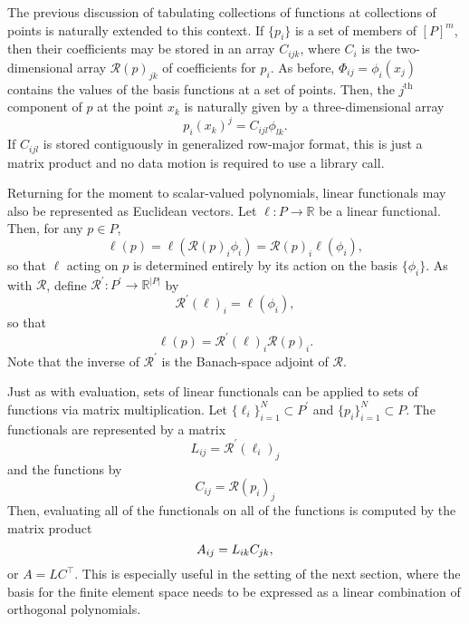 The previous discussion of tabulating collections of functions at
collections of points is naturally extended to this context.  If \( \{ p_i
\} \) is a set of members of \( [P]^m \), then their coefficients may be
stored in an array \( C_{ijk} \), where \( C_i \) is the two-dimensional
array \( \mathcal{R}(p)_{jk} \) of coefficients for \( p_i \).  As before,
\( \Phi_{ij} = \phi_i(x_j) \) contains the values of the basis functions at a set
of points.  Then, the \( j^\mathrm{th} \) component of \( p \) at the
point \( x_k \) is naturally given by a three-dimensional array
\[
p_i(x_k)^j = C_{ijl} \phi_{lk}.
\]
If \( C_{ijl} \) is stored contiguously in generalized row-major format,
this is just a matrix product and no data motion is required to
use a library call.

Returning for the moment to scalar-valued polynomials, linear functionals
may also be represented as Euclidean vectors.  Let \( \ell: P \rightarrow
\mathbb{R} \) be a linear functional.  Then, for any \( p \in P \),
\[
\ell( p ) = \ell( \mathcal{R}(p)_i \phi_i )
= \mathcal{R}(p)_i \ell( \phi_i ),
\]
so that \( \ell \) acting on \( p \) is determined entirely by its
action on the basis \( \{ \phi_i \} \).  As with \( \mathcal{R} \), define
\( \mathcal{R}^\prime : P^\prime \rightarrow \mathbb{R}^{|P|} \) by
\[
  \mathcal{R}^\prime (\ell)_i
= \ell( \phi_i),
\]
so that\vspace*{4pt}
\[
\ell(p)=\mathcal{R}^\prime(\ell)_i\mathcal{R}(p)_i.
\]
Note that the inverse of \( \mathcal{R}^\prime \) is the Banach-space
adjoint of \( \mathcal{R} \).

Just as with evaluation, sets of linear functionals can be applied
to sets of functions via matrix multiplication.  Let \( \{ \ell_i
\}_{i=1}^N \subset P^\prime \) and \( \{ p_i \}_{i=1}^N \subset P \).
The functionals are represented by a matrix
\[
L_{ij} = \mathcal{R}^\prime(\ell_i)_j
\]
and the functions by\vspace*{4pt}
\[
C_{ij} = \mathcal{R}(p_i)_j
\]
Then, evaluating all of the functionals on all of the functions is
computed by the matrix product\vspace*{-1.5pt}
\begin{equation}
A_{ij} = L_{ik}C_{jk},\vspace*{-1.5pt}
\end{equation}
or \( A = L C^{\top} \).  This is especially useful in the setting of the
next section, where the basis for the finite element space needs to be
expressed as a linear combination of orthogonal polynomials.

